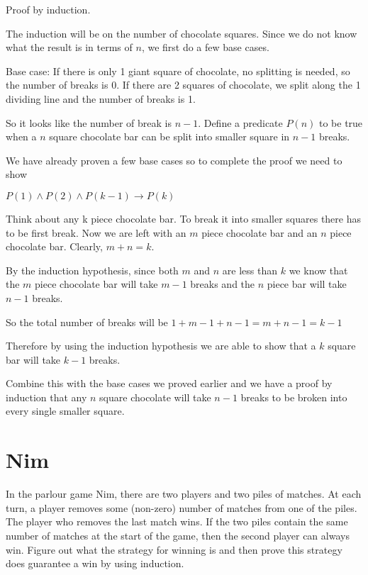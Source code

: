 \documentclass[12pt]{article}
\begin{document}
Proof by induction.

The induction will be on the number of chocolate squares. Since we do not know what the result is in terms of $n$, we first do a few base cases.

Base case: If there is only 1 giant square of chocolate, no splitting is needed, so the number of breaks is 0. If there are 2 squares of chocolate, we split along the 1 dividing line and the number of breaks is 1.

So it looks like the number of break is $n-1$. Define a predicate $P(n)$ to be true when a $n$ square chocolate bar can be split into smaller square in $n-1$ breaks. 

We have already proven a few base cases so to complete the proof we need to show

$P(1) \wedge P(2) \wedge P(k-1) \rightarrow P(k)$

Think about any k piece chocolate bar. To break it into smaller squares there has to be first break. Now we are left with an $m$ piece chocolate bar and an $n$ piece chocolate bar. Clearly, $m +n = k$.


By the induction hypothesis, since both $m$ and $n$ are less than $k$ we know that the $m$ piece chocolate bar will take $m-1$ breaks and the $n$ piece bar will take $n-1$ breaks.

So the total number of breaks will be $1 + m-1 + n- 1 = m+n -1 = k - 1$

Therefore by using the induction hypothesis we are able to show that a $k$ square bar will take $k-1$ breaks. 

Combine this with the base cases we proved earlier and we have a proof by induction that any $n$ square chocolate will take $n-1$ breaks to be broken into every single smaller square.


\section*{Nim}
In the parlour game Nim, there are two players and two piles of matches. At each
turn, a player removes some (non-zero) number of matches from one of the piles. The
player who removes the last match wins. If the two piles contain the same number of
matches at the start of the game, then the second player can always win. Figure out
what the strategy for winning is and then prove this strategy does guarantee a win by
using induction.
\end{document}
